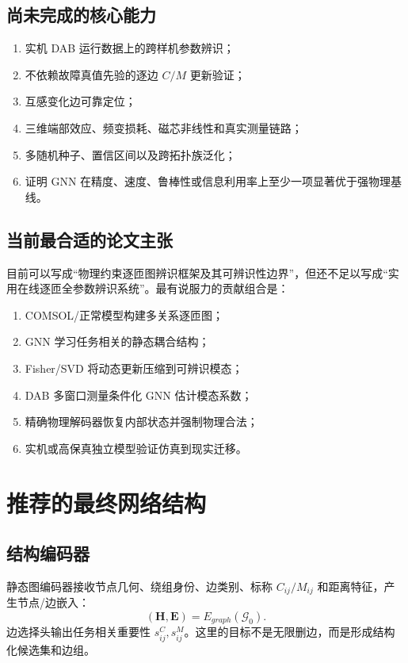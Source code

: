 \documentclass[UTF8,11pt,a4paper]{ctexart}
\newcommand{\mat}[1]{\bm{#1}}
\begin{document}
\subsection{尚未完成的核心能力}
\begin{enumerate}
  \item 实机 DAB 运行数据上的跨样机参数辨识；
  \item 不依赖故障真值先验的逐边 $C/M$ 更新验证；
  \item 互感变化边可靠定位；
  \item 三维端部效应、频变损耗、磁芯非线性和真实测量链路；
  \item 多随机种子、置信区间以及跨拓扑族泛化；
  \item 证明 GNN 在精度、速度、鲁棒性或信息利用率上至少一项显著优于强物理基线。
\end{enumerate}

\subsection{当前最合适的论文主张}
目前可以写成“物理约束逐匝图辨识框架及其可辨识性边界”，但还不足以写成“实用在线逐匝全参数辨识系统”。最有说服力的贡献组合是：
\begin{enumerate}
  \item COMSOL/正常模型构建多关系逐匝图；
  \item GNN 学习任务相关的静态耦合结构；
  \item Fisher/SVD 将动态更新压缩到可辨识模态；
  \item DAB 多窗口测量条件化 GNN 估计模态系数；
  \item 精确物理解码器恢复内部状态并强制物理合法；
  \item 实机或高保真独立模型验证仿真到现实迁移。
\end{enumerate}

\section{推荐的最终网络结构}

\subsection{结构编码器}
静态图编码器接收节点几何、绕组身份、边类别、标称 $C_{ij}/M_{ij}$ 和距离特征，产生节点/边嵌入：
\begin{equation}
(\mat H,\mat E)=E_{graph}(\mathcal G_0).
\end{equation}
边选择头输出任务相关重要性 $s_{ij}^{C},s_{ij}^{M}$。这里的目标不是无限删边，而是形成结构化候选集和边组。
\end{document}
